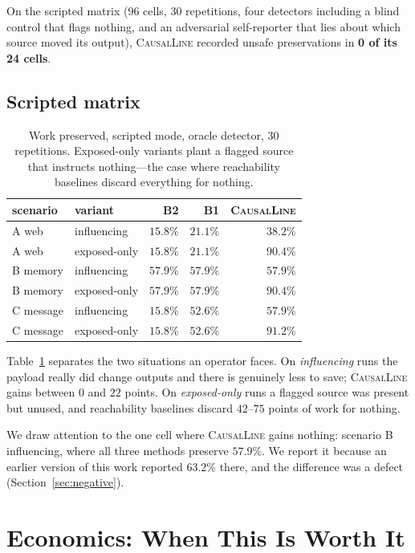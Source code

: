 \documentclass[10pt,twocolumn]{article}
\newcommand{\sys}{\textsc{CausalLine}}
\newcommand{\bone}{\textsf{B1}}
\newcommand{\btwo}{\textsf{B2}}
\begin{document}
On the scripted matrix (96 cells, 30 repetitions, four detectors including a
blind control that flags nothing, and an adversarial self-reporter that lies
about which source moved its output), \sys{} recorded unsafe preservations in
\textbf{0 of its 24 cells}.

\subsection{Scripted matrix}

\begin{table}[t]
\centering
\small
\begin{tabular}{llrrr}
\toprule
scenario & variant & \btwo{} & \bone{} & \sys{} \\
\midrule
A web       & influencing   & $15.8\%$ & $21.1\%$ & $\mathbf{38.2\%}$ \\
A web       & exposed-only  & $15.8\%$ & $21.1\%$ & $\mathbf{90.4\%}$ \\
B memory    & influencing   & $57.9\%$ & $57.9\%$ & $57.9\%$ \\
B memory    & exposed-only  & $57.9\%$ & $57.9\%$ & $\mathbf{90.4\%}$ \\
C message   & influencing   & $15.8\%$ & $52.6\%$ & $\mathbf{57.9\%}$ \\
C message   & exposed-only  & $15.8\%$ & $52.6\%$ & $\mathbf{91.2\%}$ \\
\bottomrule
\end{tabular}
\caption{Work preserved, scripted mode, oracle detector, 30 repetitions.
Exposed-only variants plant a flagged source that instructs nothing---the case
where reachability baselines discard everything for nothing.}
\label{tab:scripted}
\end{table}

Table~\ref{tab:scripted} separates the two situations an operator faces. On
\emph{influencing} runs the payload really did change outputs and there is
genuinely less to save; \sys{} gains between $0$ and $22$ points. On
\emph{exposed-only} runs a flagged source was present but unused, and
reachability baselines discard $42$--$75$ points of work for nothing.

We draw attention to the one cell where \sys{} gains nothing: scenario B
influencing, where all three methods preserve $57.9\%$. We report it because
an earlier version of this work reported $63.2\%$ there, and the difference
was a defect (Section~\ref{sec:negative}).

\section{Economics: When This Is Worth It}
\label{sec:econ}
\end{document}
